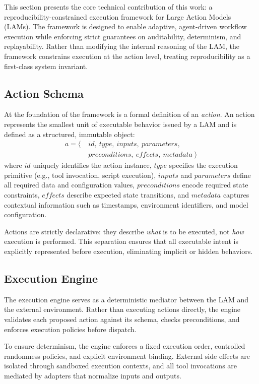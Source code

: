 \documentclass[conference]{IEEEtran}
\begin{document}
This section presents the core technical contribution of this work: a reproducibility-constrained execution framework for Large Action Models (LAMs). The framework is designed to enable adaptive, agent-driven workflow execution while enforcing strict guarantees on auditability, determinism, and replayability. Rather than modifying the internal reasoning of the LAM, the framework constrains execution at the action level, treating reproducibility as a first-class system invariant.

\subsection{Action Schema}

At the foundation of the framework is a formal definition of an \emph{action}. An action represents the smallest unit of executable behavior issued by a LAM and is defined as a structured, immutable object:
\[
\begin{aligned}
a = \langle\;& id,\ type,\ inputs,\ parameters,\\
             & preconditions,\ effects,\ metadata \;\rangle
\end{aligned}
\]
where $id$ uniquely identifies the action instance, $type$ specifies the execution primitive (e.g., tool invocation, script execution), $inputs$ and $parameters$ define all required data and configuration values, $preconditions$ encode required state constraints, $effects$ describe expected state transitions, and $metadata$ captures contextual information such as timestamps, environment identifiers, and model configuration.

Actions are strictly declarative: they describe \emph{what} is to be executed, not \emph{how} execution is performed. This separation ensures that all executable intent is explicitly represented before execution, eliminating implicit or hidden behaviors.

\subsection{Execution Engine}

The execution engine serves as a deterministic mediator between the LAM and the external environment. Rather than executing actions directly, the engine validates each proposed action against its schema, checks preconditions, and enforces execution policies before dispatch.

To ensure determinism, the engine enforces a fixed execution order, controlled randomness policies, and explicit environment binding. External side effects are isolated through sandboxed execution contexts, and all tool invocations are mediated by adapters that normalize inputs and outputs.
\end{document}
